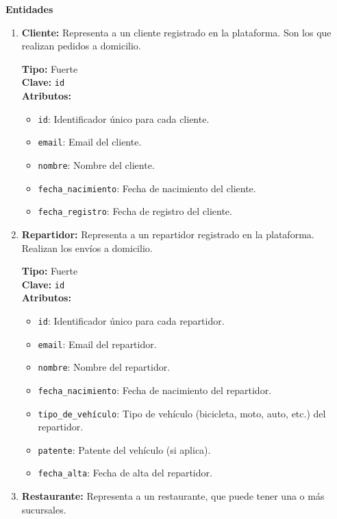 \textbf{Entidades}
\begin{enumerate}
    \item \textbf{Cliente:} Representa a un cliente registrado en la plataforma. Son los que realizan pedidos a domicilio.
    
    \textbf{Tipo:} Fuerte \\
    \textbf{Clave:} \texttt{id} \\
    \textbf{Atributos:}
    \begin{itemize}
        \item \texttt{id}: Identificador único para cada cliente.
        \item \texttt{email}: Email del cliente.
        \item \texttt{nombre}: Nombre del cliente.
        \item \texttt{fecha\_nacimiento}: Fecha de nacimiento del cliente.
        \item \texttt{fecha\_registro}: Fecha de registro del cliente.
    \end{itemize}

    \item \textbf{Repartidor:} Representa a un repartidor registrado en la plataforma. Realizan los envíos a domicilio.
    
    \textbf{Tipo:} Fuerte \\
    \textbf{Clave:} \texttt{id} \\
    \textbf{Atributos:}
    \begin{itemize}
        \item \texttt{id}: Identificador único para cada repartidor.
        \item \texttt{email}: Email del repartidor.
        \item \texttt{nombre}: Nombre del repartidor.
        \item \texttt{fecha\_nacimiento}: Fecha de nacimiento del repartidor.
        \item \texttt{tipo\_de\_vehículo}: Tipo de vehículo (bicicleta, moto, auto, etc.) del repartidor.
        \item \texttt{patente}: Patente del vehículo (si aplica).
        \item \texttt{fecha\_alta}: Fecha de alta del repartidor.
    \end{itemize}
    
    \item \textbf{Restaurante:} Representa a un restaurante, que puede tener una o más sucursales.
    

\end{enumerate}
